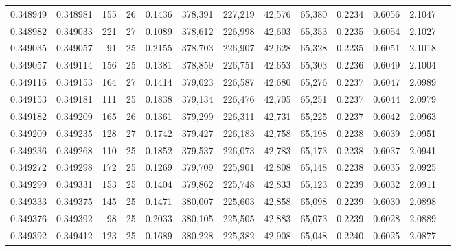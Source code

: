 \begin{tabular}{rrrrrrrrrrrrr}
0.348949 & 0.348981 &   155 &  26 &                                     0.1436 & 378,391 & 227,219 &  42,576 &  65,380 & 0.2234 & 0.6056 & 2.1047 \\
0.348982 & 0.349033 &   221 &  27 &                                     0.1089 & 378,612 & 226,998 &  42,603 &  65,353 & 0.2235 & 0.6054 & 2.1027 \\
0.349035 & 0.349057 &    91 &  25 &                                     0.2155 & 378,703 & 226,907 &  42,628 &  65,328 & 0.2235 & 0.6051 & 2.1018 \\
0.349057 & 0.349114 &   156 &  25 &                                     0.1381 & 378,859 & 226,751 &  42,653 &  65,303 & 0.2236 & 0.6049 & 2.1004 \\
0.349116 & 0.349153 &   164 &  27 &                                     0.1414 & 379,023 & 226,587 &  42,680 &  65,276 & 0.2237 & 0.6047 & 2.0989 \\
0.349153 & 0.349181 &   111 &  25 &                                     0.1838 & 379,134 & 226,476 &  42,705 &  65,251 & 0.2237 & 0.6044 & 2.0979 \\
0.349182 & 0.349209 &   165 &  26 &                                     0.1361 & 379,299 & 226,311 &  42,731 &  65,225 & 0.2237 & 0.6042 & 2.0963 \\
0.349209 & 0.349235 &   128 &  27 &                                     0.1742 & 379,427 & 226,183 &  42,758 &  65,198 & 0.2238 & 0.6039 & 2.0951 \\
0.349236 & 0.349268 &   110 &  25 &                                     0.1852 & 379,537 & 226,073 &  42,783 &  65,173 & 0.2238 & 0.6037 & 2.0941 \\
0.349272 & 0.349298 &   172 &  25 &                                     0.1269 & 379,709 & 225,901 &  42,808 &  65,148 & 0.2238 & 0.6035 & 2.0925 \\
0.349299 & 0.349331 &   153 &  25 &                                     0.1404 & 379,862 & 225,748 &  42,833 &  65,123 & 0.2239 & 0.6032 & 2.0911 \\
0.349333 & 0.349375 &   145 &  25 &                                     0.1471 & 380,007 & 225,603 &  42,858 &  65,098 & 0.2239 & 0.6030 & 2.0898 \\
0.349376 & 0.349392 &    98 &  25 &                                     0.2033 & 380,105 & 225,505 &  42,883 &  65,073 & 0.2239 & 0.6028 & 2.0889 \\
0.349392 & 0.349412 &   123 &  25 &                                     0.1689 & 380,228 & 225,382 &  42,908 &  65,048 & 0.2240 & 0.6025 & 2.0877 \\

\end{tabular}
